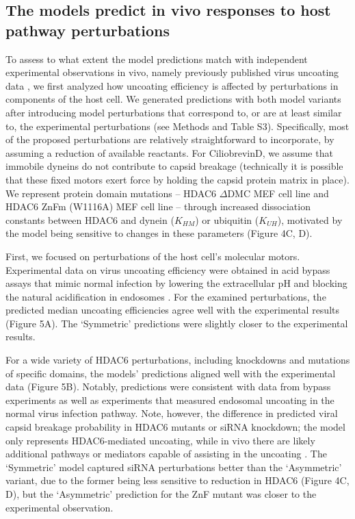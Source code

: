 \subsection{The models predict in vivo responses to host pathway perturbations}

To assess to what extent the model predictions match with independent experimental observations in vivo, namely previously published virus uncoating data \cite{banerjee2014influenza}, we first analyzed how uncoating efficiency is affected by perturbations in components of the host cell. We generated predictions with both model variants after introducing model perturbations that correspond to, or are at least similar to, the experimental perturbations (see Methods and Table S3). Specifically, most of the proposed perturbations are relatively straightforward to incorporate, by assuming a reduction of available reactants. For CiliobrevinD, we assume that immobile dyneins do not contribute to capsid breakage (technically it is possible that these fixed motors exert force by holding the capsid protein matrix in place). We represent protein domain mutations – HDAC6 $\Delta$DMC MEF cell line and HDAC6 ZnFm (W1116A) MEF cell line – through increased dissociation constants between HDAC6 and dynein ($K_{HM}$) or ubiquitin ($K_{UH}$), motivated by the model being sensitive to changes in these parameters (Figure 4C, D).

First, we focused on perturbations of the host cell’s molecular motors. Experimental data on virus uncoating efficiency were obtained in acid bypass assays that mimic normal infection by lowering the extracellular pH and blocking the natural acidification in endosomes \cite{banerjee2014influenza}. For the examined perturbations, the predicted median uncoating efficiencies agree well with the experimental results (Figure 5A). The ‘Symmetric’ predictions were slightly closer to the experimental results.

For a wide variety of HDAC6 perturbations, including knockdowns and mutations of specific domains, the models’ predictions aligned well with the experimental data (Figure 5B). Notably, predictions were consistent with data from bypass experiments as well as experiments that measured endosomal uncoating in the normal virus infection pathway. Note, however, the difference in predicted viral capsid breakage probability in HDAC6 mutants or siRNA knockdown; the model only represents HDAC6-mediated uncoating, while in vivo there are likely additional pathways or mediators capable of assisting in the uncoating \cite{gschweitl2016spopl,huotari2012cullin,miyake2019influenza,su2013pooled,yanguez2018phosphoproteomic}. The ‘Symmetric’ model captured siRNA perturbations better than the ‘Asymmetric’ variant, due to the former being less sensitive to reduction in HDAC6 (Figure 4C, D), but the ‘Asymmetric’ prediction for the ZnF mutant was closer to the experimental observation.

